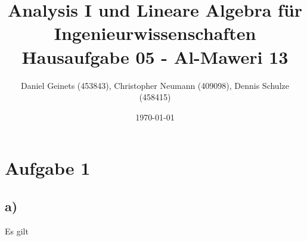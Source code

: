 \documentclass[a4paper, 11pt]{article}
\author{Daniel Geinets (453843), Christopher Neumann (409098), Dennis Schulze (458415)}
\date{\today}
\title{Analysis I und Lineare Algebra für Ingenieurwissenschaften \large  \\ Hausaufgabe 05 - Al-Maweri 13}
\begin{document}
\maketitle
\tableofcontents

\setcounter{secnumdepth}{0}
\newcommand{\tuple}[1]{\left(#1\right)}
\renewcommand{\cfrac}[3]{#1 \tuple{\frac{#2}{#3}}}
\newcommand{\R}{\mathbb{R}}
\newcommand{\Z}{\mathbb{Z}}
\newcommand{\Q}{\mathbb{Q}}
\newcommand{\N}{\mathbb{N}}
\newcommand{\C}{\mathbb{C}}

\makeatletter
\renewcommand*\env@matrix[1][*\c@MaxMatrixCols c]{%
\hskip -\arraycolsep
\let\@ifnextchar\new@ifnextchar
\array{#1}}
\makeatother

\pagebreak

\section{Aufgabe 1}
\label{sec:org42b4481}
\subsection{a)}
\label{sec:org440bc7a}
Es gilt
\end{document}
